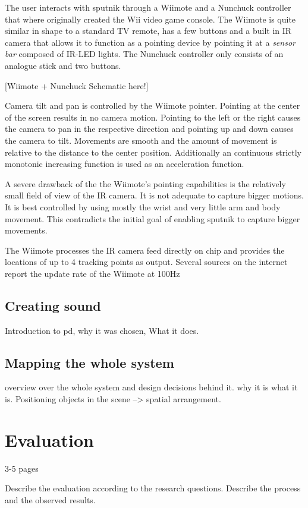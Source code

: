 \documentclass[10pt,a4paper]{scrartcl}
\begin{document}
The user interacts with sputnik through a Wiimote and a Nunchuck controller that where originally created the Wii video game console. The Wiimote is quite similar in shape to a standard TV remote, has a few buttons and a built in IR camera that allows it to function as a pointing device by pointing it at a \emph{sensor bar} composed of IR-LED lights. The Nunchuck controller only consists of an analogue stick and two buttons. 

[Wiimote + Nunchuck Schematic here!]

Camera tilt and pan is controlled by the Wiimote pointer. Pointing at the center of the screen results in no camera motion. Pointing to the left or the right causes the camera to pan in the respective direction and pointing up and down causes the camera to tilt. Movements are smooth and the amount of movement is relative to the distance to the center position. Additionally an continuous strictly monotonic increasing function is used as an acceleration function.

A severe drawback of the the Wiimote's pointing capabilities is the relatively small field of view of the IR camera. It is not adequate to capture bigger motions. It is best controlled by using mostly the wrist and very little arm and body movement. This contradicts the initial goal of enabling sputnik to capture bigger movements.

The Wiimote processes the IR camera feed directly on chip and provides the locations of up to 4 tracking points as output. Several sources on the internet report the update rate of the Wiimote at 100Hz


\subsection{Creating sound}
Introduction to pd, why it was chosen, What it does.

\subsection{Mapping the whole system}
overview over the whole system and design decisions behind it. why it is what it is.
Positioning objects in the scene --> spatial arrangement.


\section{Evaluation}
\label{sec:evaluation}
3-5 pages

Describe the evaluation according to the research questions. Describe the process and the observed results.
\end{document}
